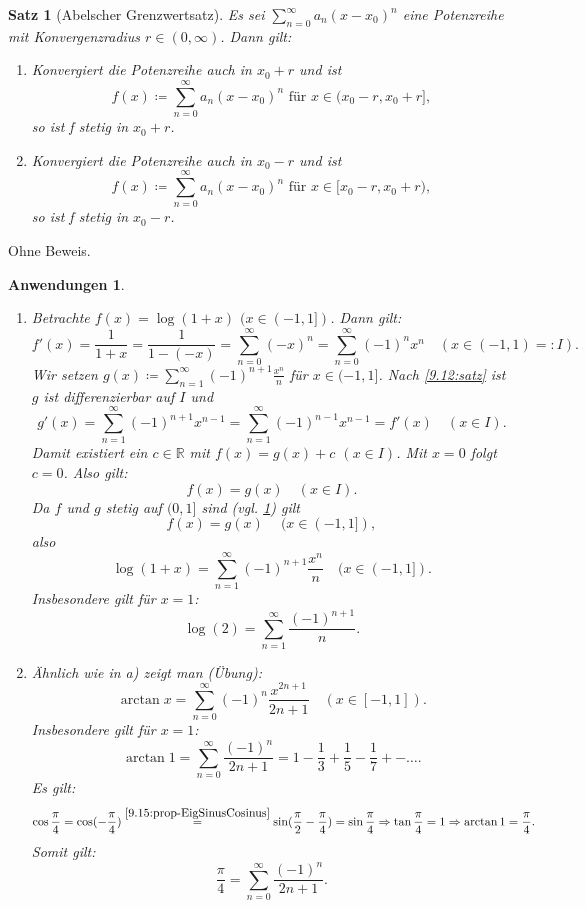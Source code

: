\documentclass[12pt]{extreport} %
\newcommand{\R}{\mathbb{R}}
\theoremstyle{named}
\theoremstyle{itshape}
\newtheorem{satz}[unnamedtheorem]{Satz}
\theoremstyle{normal}
\newtheorem{anwendungen}[unnamedtheorem]{Anwendungen}
\begin{document}
{
\begin{satz}[Abelscher Grenzwertsatz] \label{9.16:prop-AbelscherGrenzwertsatz}
Es sei $\sum_{n=0}^{\infty} a_{n} (x - x_{0})^{n}$ eine Potenzreihe mit Konvergenzradius $r \in (0,\infty)$. Dann gilt:
	\begin{enumerate}
		\item Konvergiert die Potenzreihe auch in $x_{0} + r$ und ist
			$$ f(x) \coloneqq \sum_{n=0}^{\infty} a_{n} (x - x_{0})^{n} \text{ für } x \in (x_{0} - r, x_{0} + r], $$
			so ist f stetig in $x_{0} + r$.
		\item  Konvergiert die Potenzreihe auch in $x_{0} - r$ und ist
			$$ f(x) \coloneqq \sum_{n=0}^{\infty} a_{n} (x - x_{0})^{n} \text{ für } x \in [x_{0} - r, x_{0} + r), $$
			so ist f stetig in $x_{0} - r$.
	\end{enumerate}
\end{satz}

Ohne Beweis.

\begin{anwendungen} ~\ \label{9.17:anwendungen}
	\begin{enumerate}
		\item Betrachte $f(x) = \log(1+x)$ $(x \in (-1, 1])$. Dann gilt: \label{9.17.a:anwendungen}
			$$ f'(x) = \frac{1}{1+x} = \frac{1}{1 - (-x)} = \sum_{n=0}^{\infty} (-x)^{n} = \sum_{n=0}^{\infty} (-1)^{n} x^{n} \quad (x \in (-1,1)=:I). $$
			Wir setzen $g(x) \coloneqq \sum_{n=1}^{\infty} (-1)^{n+1} \frac{x^{n}}{n}$ für $x \in (-1, 1]$. Nach \ref{9.12:satz} ist $g$ ist differenzierbar auf $I$ und 
			$$ g'(x) = \sum_{n=1}^{\infty} (-1)^{n+1} x^{n-1} = \sum_{n=1}^{\infty} (-1)^{n-1} x^{n-1} = f'(x) \quad (x \in I). $$
			Damit existiert ein $c \in \R$ mit $f(x) = g(x) + c$ $(x \in I)$. Mit $x = 0$ folgt $c = 0$. Also gilt:
			$$ f(x) = g(x) \quad (x \in I). $$
			Da $f$ und $g$ stetig auf $(0,1]$ sind (vgl. \ref{9.16:prop-AbelscherGrenzwertsatz}) gilt
			$$f(x) = g(x) ~ \quad (x \in (-1, 1]), $$ also 
			$$ \log(1+x) = \sum_{n=1}^{\infty} (-1)^{n+1} \frac{x^{n}}{n} \quad (x \in (-1 , 1]). $$
			Insbesondere gilt für $x = 1$: 
			$$\log(2) = \sum_{n=1}^{\infty} \frac{(-1)^{n+1}}{n}.$$ 
		\item  Ähnlich wie in a) zeigt man (\"Ubung): \label{9.17.b:anwendungen}
			$$ \arctan x = \sum_{n=0}^{\infty} (-1)^{n} \frac{x^{2n +1}}{2n + 1} \quad (x \in [-1, 1]). $$
			Insbesondere gilt für $x = 1$: 
			$$\arctan 1 = \sum_{n=0}^{\infty} \frac{(-1)^{n}}{2n + 1} = 1 - \frac{1}{3} + \frac{1}{5} - \frac{1}{7} +- \dotsc.$$
			Es gilt:
		        $$ \cos \frac{\pi}{4} = \cos(-\frac{\pi}{4}) \overset{\ref{9.15:prop-EigSinusCosinus}}{=} \sin( \frac{\pi}{2} - \frac{\pi}{4}) 
		        = \sin \frac{\pi}{4} \Rightarrow \tan \frac{\pi}{4} = 1 \Rightarrow \arctan 1 = \frac{\pi}{4}. $$
		        Somit gilt:
		        $$\frac{\pi}{4} = \sum_{n=0}^{\infty} \frac{(-1)^{n}}{2n + 1}.$$
	\end{enumerate}
\end{anwendungen}

}
\end{document}
